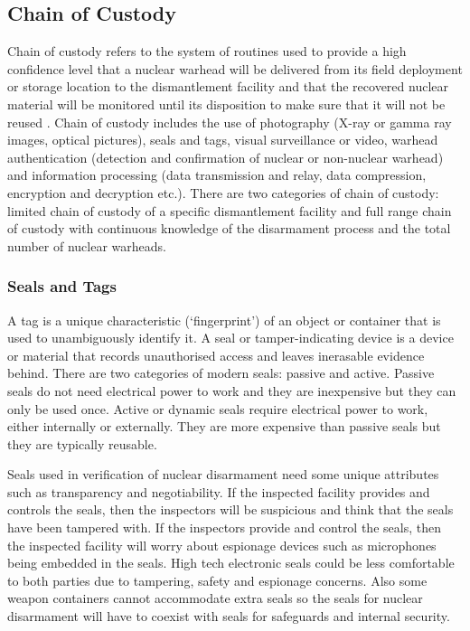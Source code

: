 \documentclass[twoside,titlepage,11pt,twocolumn,a4paper]{article}
\begin{document}
\subsection{Chain of Custody}
Chain of custody refers to the system of routines used to provide a
high confidence level that a nuclear warhead will be delivered from
its field deployment or storage location to the dismantlement facility
and that the recovered nuclear material will be monitored until its
disposition to make sure that it will not be reused
\citep{zarimpas2003}. Chain of custody includes the use of photography
(X-ray or gamma ray images, optical pictures), seals and tags, visual
surveillance or video, warhead authentication (detection and
confirmation of nuclear or non-nuclear warhead) and information
processing (data transmission and relay, data compression, encryption
and decryption etc.). There are two categories of chain of custody:
limited chain of custody of a specific dismantlement facility and full
range chain of custody with continuous knowledge of the disarmament
process and the total number of nuclear warheads. \citep{wuwen2004}

\subsubsection{Seals and Tags}
A tag is a unique characteristic (`fingerprint') of an object or
container that is used to unambiguously identify it. A seal or
tamper-indicating device is a device or material that records
unauthorised access and leaves inerasable evidence behind. There are
two categories of modern seals: passive and active. Passive seals do
not need electrical power to work and they are inexpensive but they
can only be used once. Active or dynamic seals require electrical
power to work, either internally or externally. They are more
expensive than passive seals but they are typically reusable. 
\citep{nuclearTamperSeals2001}

Seals used in verification of nuclear disarmament need some unique
attributes such as transparency and negotiability. If the inspected
facility provides and controls the seals, then the inspectors will be
suspicious and think that the seals have been tampered with. If the
inspectors provide and control the seals, then the inspected facility
will worry about espionage devices such as microphones being embedded
in the seals. High tech electronic seals could be less comfortable to
both parties due to tampering, safety and espionage concerns. Also
some weapon containers cannot accommodate extra seals so the seals for
nuclear disarmament will have to coexist with seals for safeguards and
internal security. \citep{nuclearTamperSeals2001}
\end{document}
